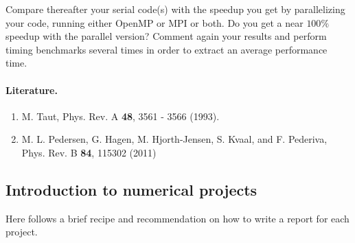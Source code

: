 \documentclass[%
oneside,                 %
final,                   %
10pt]{article}
\begin{document}
Compare thereafter your serial code(s)  with the speedup you get by parallelizing your code, running either OpenMP or MPI or both.
Do you get a near $100\%$ speedup with the parallel version? Comment again your results and perform timing benchmarks several times in order
to extract  an average performance time.



\paragraph{Literature.}
\begin{enumerate}
 \item M. Taut, Phys. Rev. A \textbf{48}, 3561 - 3566 (1993).

 \item M. L. Pedersen, G. Hagen, M. Hjorth-Jensen, S. Kvaal,  and F. Pederiva, Phys. Rev. B \textbf{84}, 115302 (2011)
\end{enumerate}

\noindent
\subsection{Introduction to numerical projects}

Here follows a brief recipe and recommendation on how to write a report for each
project.
\end{document}
